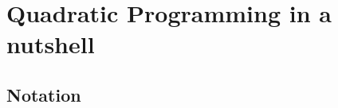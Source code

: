
\section{Quadratic Programming in a nutshell}\label{sec:QPbasic}

\subsection{Notation}\label{subsec:notation}

